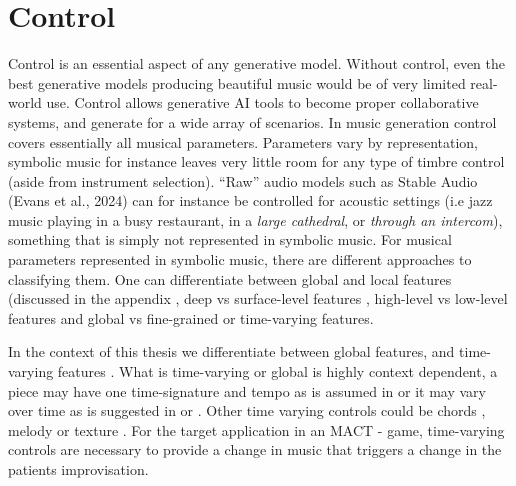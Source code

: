 
\section{Control} \label{section:control}
Control is an essential aspect of any generative model. Without control, even the best generative models producing beautiful music would be of very limited real-world use. Control allows generative AI tools to become proper collaborative systems, and generate for a wide array of scenarios. In music generation control covers essentially all musical parameters. Parameters vary by representation, symbolic music for instance leaves very little room for any type of timbre control (aside from instrument selection). “Raw” audio models such as Stable Audio (Evans et al., 2024) can for instance be controlled for acoustic settings (i.e jazz music playing in a busy restaurant, in a \textit{large cathedral}, or \textit{through an intercom}), something that is simply not represented in symbolic music. For musical parameters represented in symbolic music, there are different approaches to classifying them. One can differentiate between global and local features (discussed in the appendix \) \cite{Van_Kranenburg_Volk_Wiering_2013}, deep vs surface-level features \cite{Blacking_1971}, high-level vs low-level features \cite{heremans} and global vs fine-grained or time-varying features. 

In the context of this thesis we differentiate between global features, and time-varying features \cite{Rütte_figaro_2023}. What is time-varying or global is highly context dependent, a piece may have one time-signature and tempo as is assumed in \cite{Lu_Xu_Kang_Yu_Xing_Tan_Bian_MuseCoco_2023} or it may vary over time as is suggested in \cite{Rütte_figaro_2023} or \cite{Huang_Yang_remi_pop_transformer_2020}. Other time varying controls could be chords \cite{Rütte_figaro_2023}\cite{Wu_Donahue_musicontrolnet_2023}\cite{Lan_Hsiao_Cheng_Yang_musicongen_2024}\cite{Min_Jiang_Xia_Zhao_polyffusion_2023}, melody \cite{copet2023simple}\cite{Min_Jiang_Xia_Zhao_polyffusion_2023} or texture \cite{Min_Jiang_Xia_Zhao_polyffusion_2023}. For the target application in an MACT - game, time-varying controls are necessary to provide a change in music that triggers a change in the patients improvisation.


